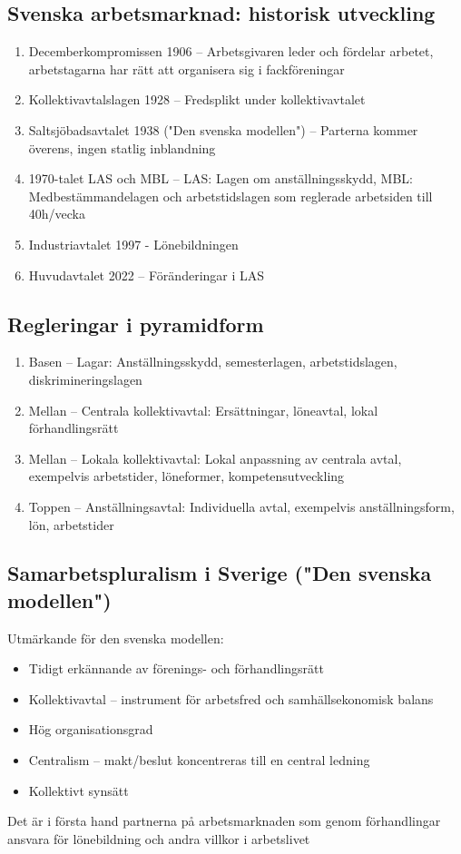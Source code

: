 \documentclass[12pt]{article}
\begin{document}
\subsection{Svenska arbetsmarknad: historisk utveckling}
\begin{enumerate}
    \item Decemberkompromissen 1906 -- Arbetsgivaren leder och fördelar arbetet, arbetstagarna har rätt att organisera sig i fackföreningar
    \item Kollektivavtalslagen 1928 -- Fredsplikt under kollektivavtalet
    \item Saltsjöbadsavtalet 1938 ("Den svenska modellen") -- Parterna kommer överens, ingen statlig inblandning
    \item 1970-talet LAS och MBL -- LAS: Lagen om anställningsskydd, MBL: Medbestämmandelagen och arbetstidslagen som reglerade arbetsiden till 40h/vecka
    \item Industriavtalet 1997 - Lönebildningen
    \item Huvudavtalet 2022 -- Föränderingar i LAS 
\end{enumerate}

\subsection{Regleringar i pyramidform}
\begin{enumerate}
    \item Basen -- Lagar: Anställningsskydd, semesterlagen, arbetstidslagen, diskrimineringslagen
    \item Mellan -- Centrala kollektivavtal: Ersättningar, löneavtal, lokal förhandlingsrätt
    \item Mellan -- Lokala kollektivavtal: Lokal anpassning av centrala avtal, exempelvis arbetstider, löneformer, kompetensutveckling
    \item Toppen -- Anställningsavtal: Individuella avtal, exempelvis anställningsform, lön, arbetstider
\end{enumerate}

\subsection{Samarbetspluralism i Sverige ("Den svenska modellen")}
Utmärkande för den svenska modellen:
\begin{itemize}
    \item Tidigt erkännande av förenings- och förhandlingsrätt
    \item Kollektivavtal -- instrument för arbetsfred och samhällsekonomisk balans
    \item Hög organisationsgrad
    \item Centralism -- makt/beslut koncentreras till en central ledning
    \item Kollektivt synsätt
\end{itemize}
Det är i första hand partnerna på arbetsmarknaden som genom förhandlingar ansvara för lönebildning och andra villkor i arbetslivet 
\end{document}
